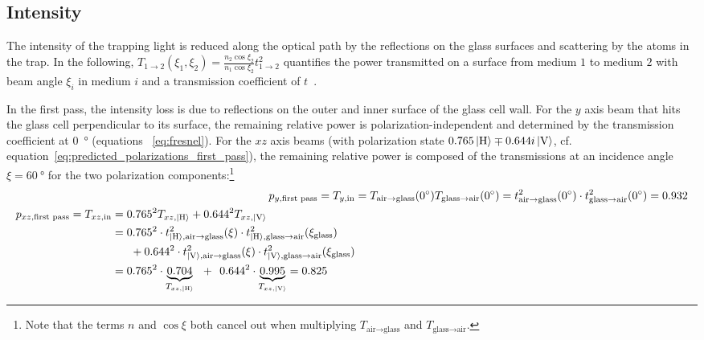\subsection*{Intensity}
The intensity of the trapping light is reduced along the optical path by the reflections on the glass surfaces and scattering by the atoms in the trap. In the following, $T_{1 \rightarrow 2}(\xi_1, \xi_2) = \frac{n_2 \cos \xi_2 }{n_1 \cos \xi_2} t_{1\rightarrow 2}^2$ quantifies the power transmitted on a surface from medium $1$ to medium $2$ with beam angle $\xi_i$ in medium $i$ and a transmission coefficient of $t$~\cite{demtroder_elektromagnetische_2013}.

In the first pass, the intensity loss is due to reflections on the outer and inner surface of the glass cell wall. For the $y$ axis beam that hits the glass cell perpendicular to its surface, the remaining relative power is polarization-independent and determined by the transmission coefficient at \SI{0}{\degree} (equations ~\ref{eq:fresnel}). For the $xz$ axis beams (with polarization state $0.765 \Ket{\text{H}} \mp 0.644i \Ket{\text{V}}$, cf. equation~\ref{eq:predicted_polarizations_first_pass}), the remaining relative power is composed of the transmissions at an incidence angle $\xi = \SI{60}{\degree}$ for the two polarization components:\footnote{Note that the terms $n$ and $\cos \xi$ both cancel out when multiplying $T_{\text{air} \rightarrow \text{glass}}$ and $T_{\text{glass} \rightarrow \text{air}}$.}
\begin{align}
    p_{y, \text{first pass}} = T_{y, \text{in}} &= T_{\text{air} \rightarrow \text{glass}}(\SI{0}{\degree}) T_{\text{glass} \rightarrow \text{air}}(\SI{0}{\degree}) = t^2_{\text{air} \rightarrow \text{glass}}(\SI{0}{\degree}) \cdot t^2_{\text{glass} \rightarrow \text{air}}(\SI{0}{\degree}) = \SI{0.932}{}\\
    \begin{split}
        p_{xz, \text{first pass}} = T_{xz, \text{in}} &= 0.765^2 T_{xz, \Ket{\text{H}}} + 0.644^2 T_{xz, \Ket{\text{V}}} \\
        &=  0.765^2 \cdot  t^2_{\Ket{\text{H}}, \text{air} \rightarrow \text{glass}}(\xi) \cdot t^2_{\Ket{\text{H}}, \text{glass} \rightarrow \text{air}}(\xi_\text{glass})\\ &~~~~~+ 0.644^2 \cdot t^2_{\Ket{\text{V}}, \text{air} \rightarrow \text{glass}}(\xi) \cdot t^2_{\Ket{\text{V}}, \text{glass} \rightarrow \text{air}}(\xi_\text{glass}) \\
        &= 0.765^2 \cdot \underbrace{0.704}_{T_{xz, \Ket{\text{H}}}} ~~+~~ 0.644^2 \cdot \underbrace{0.995}_{T_{xz, \Ket{\text{V}}}} = 0.825
    \end{split}
\end{align}

